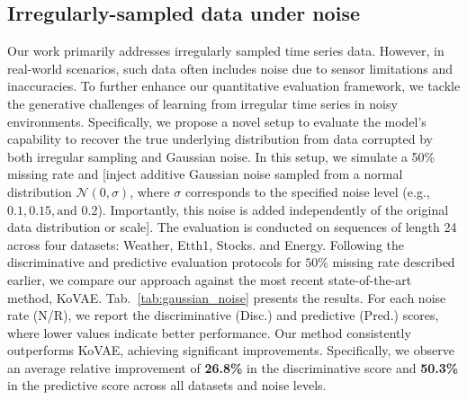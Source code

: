 \documentclass{article}
\theoremstyle{plain}
\theoremstyle{definition}
\theoremstyle{remark}
\newcommand {\idan}[1]{{\color{red}[#1]}}
\begin{document}
\subsection{Irregularly-sampled data under noise}
\vspace{-2mm}
Our work primarily addresses irregularly sampled time series data. However, in real-world scenarios, such data often includes noise due to sensor limitations and inaccuracies. To further enhance our quantitative evaluation framework, we tackle the generative challenges of learning from irregular time series in noisy environments. Specifically, we propose a novel setup to evaluate the model's capability to recover the true underlying distribution from data corrupted by both irregular sampling and Gaussian noise. In this setup, we simulate a 50\% missing rate and \idan{inject additive Gaussian noise sampled from a normal distribution $\mathcal{N}(0, \sigma)$, where $\sigma$ corresponds to the specified noise level (e.g., $0.1, 0.15, \text{and } 0.2$). Importantly, this noise is added independently of the original data distribution or scale}. The evaluation is conducted on sequences of length 24 across four datasets: Weather, Etth1, Stocks. and Energy.  Following the discriminative and predictive evaluation protocols for $50\%$ missing rate described earlier, we compare our approach against the most recent state-of-the-art method, KoVAE. Tab.~\ref{tab:gaussian_noise} presents the results. For each noise rate (N/R), we report the discriminative (Disc.) and predictive (Pred.) scores, where lower values indicate better performance. Our method consistently outperforms KoVAE, achieving significant improvements. Specifically, we observe an average relative improvement of \textbf{26.8\%} in the discriminative score and \textbf{50.3\%} in the predictive score across all datasets and noise levels.
\end{document}
